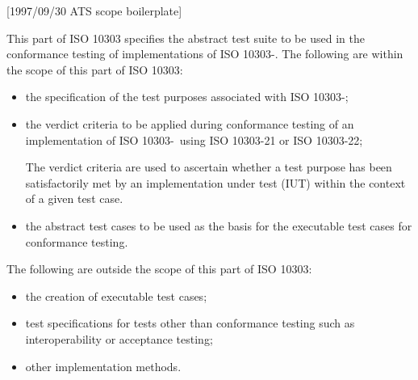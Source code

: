 [1997/09/30 ATS scope boilerplate]

    This part of ISO 10303 specifies the abstract test suite to be
used in the conformance testing of implementations of
ISO 10303-\theAPpartno.
The following are within the scope of this part of ISO 10303:
\begin{itemize}
\item the specification of the test purposes associated with
      ISO 10303-\theAPpartno;
\item the verdict criteria to be applied during conformance
      testing of an implementation of ISO 10303-\theAPpartno\
      using ISO 10303-21 or ISO 10303-22;
  \begin{anote}
  The verdict criteria are used to ascertain whether a test purpose
  has been satisfactorily met by an implementation under test (IUT)
  within the context of a given test case.
  \end{anote}
\item the abstract test cases to be used as the basis for the
      executable test cases for conformance testing.
\end{itemize}

The following are outside the scope of this part of ISO 10303:
\begin{itemize}
\item the creation of executable test cases;
\item test specifications for tests other than conformance testing
      such as interoperability or acceptance testing;
\item other implementation methods.
\end{itemize}

\endinput

